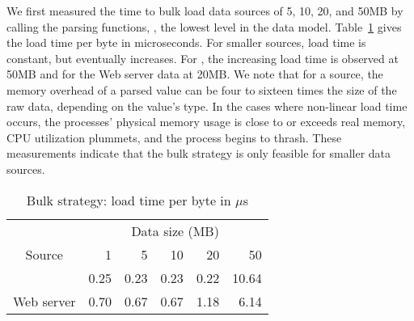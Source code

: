 We first measured the time to bulk load data sources of 5, 10, 20, and
50MB by calling the \pads{} parsing functions, \ie{}, the lowest level
in the \padx{} data model.  Table~\ref{tab:bulk} gives the load time
per byte in microseconds.  For smaller sources, load time is constant,
but eventually increases.  For \dibbler{}, the increasing load time is
observed at 50MB and for the Web server data at 20MB.  We note that
for a \pads{} source, the memory overhead of a \pads{} parsed value
can be four to sixteen times the size of the raw data, depending on
the value's type.  In the cases where non-linear load time occurs, the
processes' physical memory usage is close to or exceeds real memory,
CPU utilization plummets, and the process begins to thrash.  These
measurements indicate that the bulk strategy is only feasible for
smaller data sources.
\begin{table}
\begin{center}

\begin{tabular}{c|r|r|r|r|r}
           & \multicolumn{5}{c}{Data size (MB)} \\
Source     & 1  & 5 & 10 & 20 & 50  \\ \hline
\dibbler{} &  0.25& 0.23&  0.23& 0.22&  10.64 \\ \hline
Web server &  0.70& 0.67&  0.67& 1.18&  6.14 
\end{tabular}

\end{center}
\caption{Bulk strategy: load time per byte in $\mu$s}
\label{tab:bulk}
\end{table}

